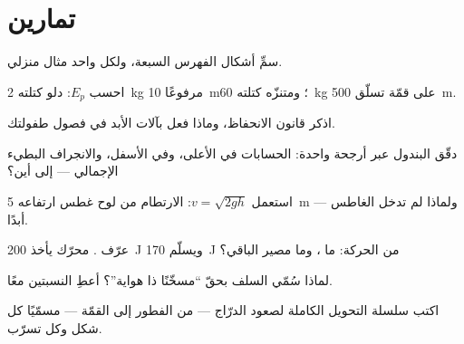 \section{تمارين}

\begin{exercise}[$\star$]\label{exo:g9:energy-conversions:1}
سمِّ أشكال الفهرس السبعة، ولكل واحد مثال منزلي.
\end{exercise}

\begin{exercise}[$\star$]\label{exo:g9:energy-conversions:2}
احسب $E_p$: دلو كتلته \qty{2}{kg} مرفوعًا \qty{10}{m}؛ ومتنزّه
كتلته \qty{60}{kg} على قمّة تسلّق \qty{500}{m}.
\end{exercise}

\begin{exercise}[$\star$]\label{exo:g9:energy-conversions:3}
اذكر قانون الانحفاظ، وماذا فعل بآلات الأبد في فصول طفولتك.
\end{exercise}

\begin{exercise}[$\star$]\label{exo:g9:energy-conversions:4}
دقّق البندول عبر أرجحة واحدة: الحسابات في الأعلى، وفي الأسفل،
والانجراف البطيء الإجمالي --- إلى أين؟
\end{exercise}

\begin{exercise}[$\star$]\label{exo:g9:energy-conversions:5}
استعمل $v = \sqrt{2 g h}$:  الارتطام من لوح غطس ارتفاعه
\qty{5}{m} --- ولماذا لم تدخل  الغاطس أبدًا.
\end{exercise}

\begin{exercise}[$\star$]\label{exo:g9:energy-conversions:6}
عرّف . محرّك يأخذ \qty{200}{J} ويسلّم \qty{170}{J} من
الحركة: ما ، وما مصير الباقي؟
\end{exercise}

\begin{exercise}[$\star$]\label{exo:g9:energy-conversions:7}
لماذا سُمّي  السلف بحقّ ``مسخّنًا ذا هواية''؟ أعطِ
النسبتين معًا.
\end{exercise}

\begin{exercise}[$\star$]\label{exo:g9:energy-conversions:8}
اكتب سلسلة التحويل الكاملة لصعود الدرّاج --- من الفطور إلى
القمّة --- مسمّيًا كل شكل وكل تسرّب.
\end{exercise}

